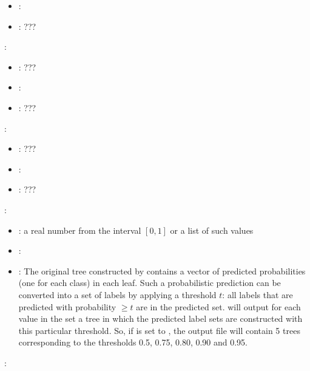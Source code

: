 \begin{itemize}
{\begin{itemize}
                \item \optionDefaultValue{}: 
                \item \optionDescrption{}: ???
           \end{itemize}
    \item {}:
           \begin{itemize}
                \item \optionPossibleValues{}: ???
                \item \optionDefaultValue{}: 
                \item \optionDescrption{}: ???
           \end{itemize}
    \item {}:
           \begin{itemize}
                \item \optionPossibleValues{}: ???
                \item \optionDefaultValue{}: 
                \item \optionDescrption{}: ???
           \end{itemize}
       }
    \item {}:
           \begin{itemize}
                \item \optionPossibleValues{}: a real number from the interval $[0, 1]$ or a list of such values
                \item \optionDefaultValue{}: 
                \item \optionDescrption{}:  The original tree constructed by \clus{} contains a vector of predicted probabilities (one for each class) in each leaf.
                Such a probabilistic prediction can be converted into a set of labels by applying a threshold $t$: all labels that are predicted with probability $\geq t$ are in the predicted set.
                \clus{} will output for each value in the set a tree in which the predicted label sets are constructed with this particular threshold.
                So, if  is set to , the output file will contain 5 trees corresponding to the thresholds 0.5, 0.75, 0.80, 0.90 and 0.95.
           \end{itemize}
    \item {}:

\end{itemize}
